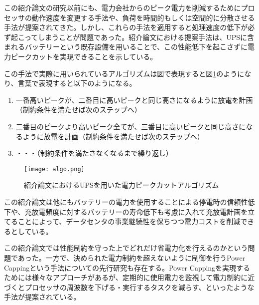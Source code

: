 この紹介論文の研究以前にも、電力会社からのピーク電力を削減するためにプロセッサの動作速度を変更する手法\cite{Chen:2005:MSE:1064212.1064253,Isci:2006:AEM:1194816.1194850,Raghavendra:2008:NPS:1353534.1346289,4658632,4658631}や、負荷を時間的もしくは空間的に分散させる手法\cite{Unleash,Moore:2005:MSC:1247360.1247365}が提案されてきた。しかし、これらの手法を適用すると処理速度の低下が必ず起こってしまうことが問題であった。紹介論文における提案手法は、UPSに含まれるバッテリーという既存設備を用いることで、この性能低下を起こさずに電力ピークカットを実現できることを示している。

この手法で実際に用いられているアルゴリズムは図で表現すると図\ref{fig:algo}のようになり、言葉で表現すると以下のようになる。

\begin{enumerate}
  \item 一番高いピークが、二番目に高いピークと同じ高さになるように放電を計画（制約条件を満たせば次のステップへ）
  \item 二番目のピークより高いピーク全てが、三番目に高いピークと同じ高さになるように放電を計画（制約条件を満たせば次のステップへ）
  \item ・・・（制約条件を満たさなくなるまで繰り返し）
\end{enumerate}

\begin{figure}[t]
 \begin{center}
  \texttt{[image: algo.png]}
 \end{center}
 \caption{紹介論文\cite{Govindan:2011:BLT:2024723.2000105}におけるUPSを用いた電力ピークカットアルゴリズム}
 \label{fig:algo}
\end{figure}

この紹介論文は他にもバッテリーの電力を使用することによる停電時の信頼性低下や、充放電頻度に対するバッテリーの寿命低下も考慮に入れて充放電計画を立てることによって、データセンタの事業継続性を保ちつつ電力コストを削減できるとしている。

この紹介論文では性能制約を守った上でどれだけ省電力化を行えるのかという問題であった。一方で、決められた電力制約を超えないように制御を行うPower Cappingという手法についての先行研究も存在する\cite{Fan:2007:PPW:1273440.1250665}。Power Cappingを実現するためには様々なアプローチがあるが、定期的に使用電力を監視して電力制約に近づくとプロセッサの周波数を下げる・実行するタスクを減らす、といったような手法が提案されている。




